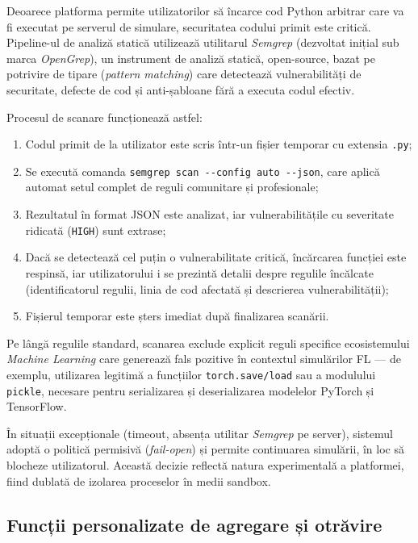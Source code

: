 \documentclass[../../main.tex]{subfiles}
\begin{document}
    Deoarece platforma permite utilizatorilor să încarce cod Python arbitrar care va fi executat pe serverul de simulare, securitatea codului primit este critică. Pipeline-ul de analiză statică utilizează utilitarul \textit{Semgrep} (dezvoltat inițial sub marca \textit{OpenGrep}), un instrument de analiză statică, open-source, bazat pe potrivire de tipare (\textit{pattern matching}) care detectează vulnerabilități de securitate, defecte de cod și anti-șabloane fără a executa codul efectiv.

    Procesul de scanare funcționează astfel:

    \begin{enumerate}
        \item Codul primit de la utilizator este scris într-un fișier temporar cu extensia \texttt{.py};
        \item Se execută comanda \texttt{semgrep scan -{}-config auto -{}-json}, care aplică automat setul complet de reguli comunitare și profesionale;
        \item Rezultatul în format JSON este analizat, iar vulnerabilitățile cu severitate ridicată (\texttt{HIGH}) sunt extrase;
        \item Dacă se detectează cel puțin o vulnerabilitate critică, încărcarea funcției este respinsă, iar utilizatorului i se prezintă detalii despre regulile încălcate (identificatorul regulii, linia de cod afectată și descrierea vulnerabilității);
        \item Fișierul temporar este șters imediat după finalizarea scanării.
    \end{enumerate}

    Pe lângă regulile standard, scanarea exclude explicit reguli specifice ecosistemului \textit{Machine Learning} care generează fals pozitive în contextul simulărilor FL --- de exemplu, utilizarea legitimă a funcțiilor \texttt{torch.save/load} sau a modulului \texttt{pickle}, necesare pentru serializarea și deserializarea modelelor PyTorch și TensorFlow.

    În situații excepționale (timeout, absența utilitar \textit{Semgrep} pe server), sistemul adoptă o politică permisivă (\textit{fail-open}) și permite continuarea simulării, în loc să blocheze utilizatorul. Această decizie reflectă natura experimentală a platformei, fiind dublată de izolarea proceselor în medii sandbox.

    \subsection{Funcții personalizate de agregare și otrăvire}
\end{document}
